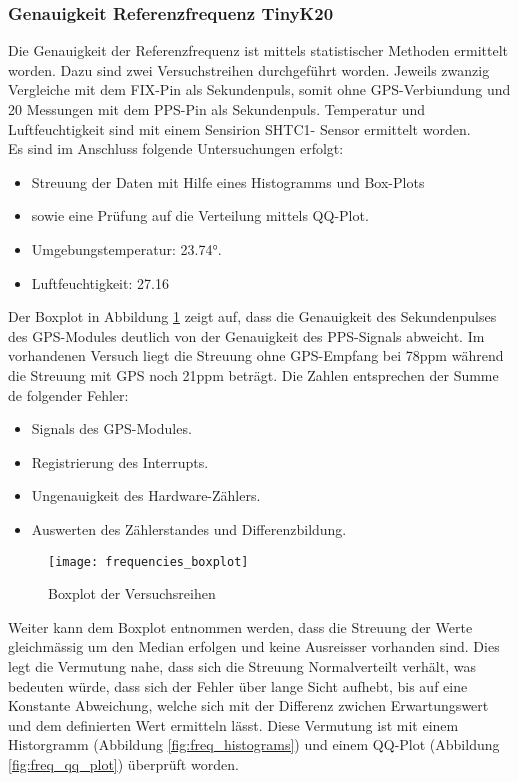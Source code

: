 \subsubsection{Genauigkeit Referenzfrequenz TinyK20}
Die Genauigkeit der Referenzfrequenz ist mittels statistischer Methoden ermittelt worden. Dazu sind zwei Versuchstreihen durchgeführt worden. Jeweils zwanzig Vergleiche mit dem FIX-Pin als Sekundenpuls, somit ohne GPS-Verbiundung und 20 Messungen mit dem PPS-Pin als Sekundenpuls. Temperatur und Luftfeuchtigkeit sind mit einem Sensirion SHTC1- Sensor ermittelt worden.\\
Es sind im Anschluss folgende Untersuchungen erfolgt:
\begin{itemize}
	\item Streuung der Daten mit Hilfe eines Histogramms und Box-Plots
	\item sowie eine Prüfung auf die Verteilung mittels QQ-Plot.
	\item Umgebungstemperatur: 23.74°.
	\item Luftfeuchtigkeit: 27.16%
\end{itemize}
Der Boxplot in Abbildung \ref{fig:freq_boxplot} zeigt auf, dass die Genauigkeit des Sekundenpulses des GPS-Modules deutlich von der Genauigkeit des PPS-Signals abweicht. Im vorhandenen Versuch liegt die Streuung ohne GPS-Empfang bei 78ppm während die Streuung mit GPS noch 21ppm beträgt. Die Zahlen entsprechen der Summe de folgender Fehler:
\begin{itemize}
	\item Signals des GPS-Modules.
	\item Registrierung des Interrupts.
	\item Ungenauigkeit des Hardware-Zählers.
	\item Auswerten des Zählerstandes und Differenzbildung. 
\end{itemize}
	\begin{figure}[H]
		\centering
		\texttt{[image: frequencies\_boxplot]}
		\caption{Boxplot der Versuchsreihen}
		\label{fig:freq_boxplot}
	\end{figure}
%
Weiter kann dem Boxplot entnommen werden, dass die Streuung der Werte gleichmässig um den Median erfolgen und keine Ausreisser vorhanden sind. Dies legt die Vermutung nahe, dass sich die Streuung Normalverteilt verhält, was bedeuten würde, dass sich der Fehler über lange Sicht aufhebt, bis auf eine Konstante Abweichung, welche sich mit der Differenz zwichen Erwartungswert und dem definierten Wert ermitteln lässt. Diese Vermutung ist mit einem Historgramm (Abbildung \ref{fig:freq_histograms}) und einem QQ-Plot (Abbildung \ref{fig:freq_qq_plot}) überprüft worden.
